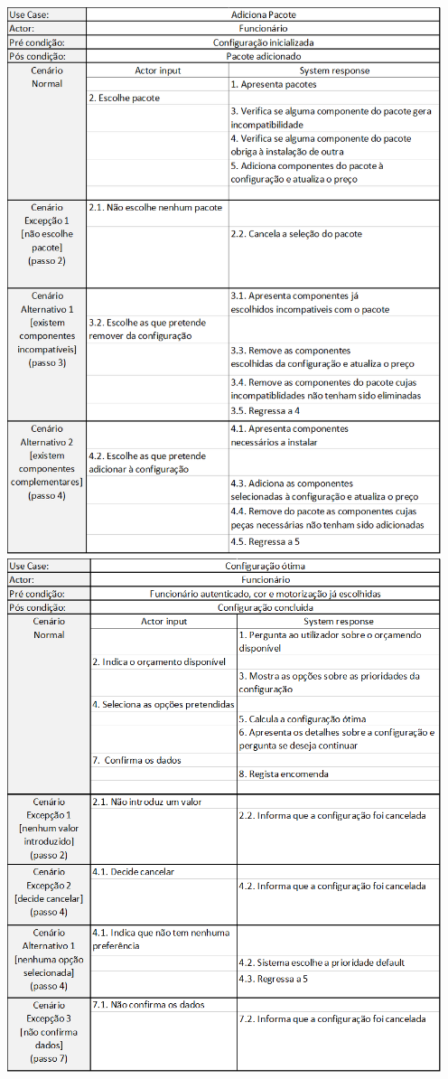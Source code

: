 \documentclass[11pt]{article} %
\begin{document}
\begin{enumerate}
\begin{center}
 		\includegraphics[width = 5in]{ac_adicionapacote.png} 
		\includegraphics[width = 5in]{ac_configotima.png}

\end{center}
\end{enumerate}
\end{document}
